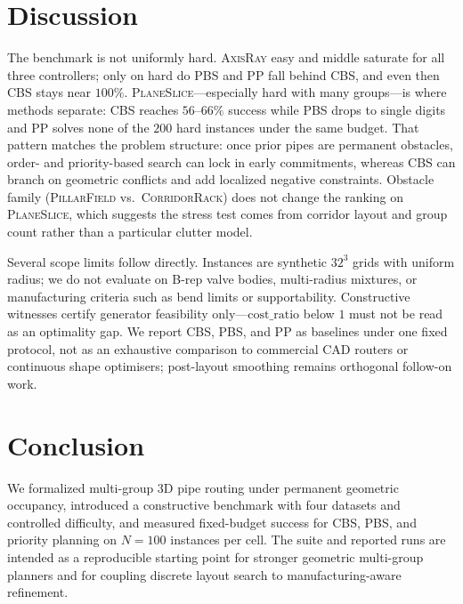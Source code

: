 
\section{Discussion}
\label{sec:discussion}

The benchmark is not uniformly hard.
\textsc{AxisRay} easy and middle saturate for all three controllers; only on
hard do PBS and PP fall behind CBS, and even then CBS stays near $100\%$.
\textsc{PlaneSlice}---especially hard with many groups---is where methods
separate: CBS reaches $56$--$66\%$ success while PBS drops to single digits
and PP solves none of the $200$ hard instances under the same budget.
That pattern matches the problem structure: once prior pipes are permanent
obstacles, order- and priority-based search can lock in early commitments,
whereas CBS can branch on geometric conflicts and add localized negative
constraints.
Obstacle family (\textsc{PillarField} vs.\ \textsc{CorridorRack}) does not
change the ranking on \textsc{PlaneSlice}, which suggests the stress test
comes from corridor layout and group count rather than a particular clutter
model.

Several scope limits follow directly.
Instances are synthetic $32^3$ grids with uniform radius; we do not evaluate on
B-rep valve bodies, multi-radius mixtures, or manufacturing criteria such as
bend limits or supportability.
Constructive witnesses certify generator feasibility only---$\mathrm{cost\_ratio}$
below $1$ must not be read as an optimality gap.
We report CBS, PBS, and PP as baselines under one fixed protocol, not as an
exhaustive comparison to commercial CAD routers or continuous shape
optimisers; post-layout smoothing remains orthogonal follow-on work.

\section{Conclusion}
\label{sec:conclusion}

We formalized multi-group 3D pipe routing under permanent geometric occupancy,
introduced a constructive benchmark with four datasets and controlled difficulty,
and measured fixed-budget success for CBS, PBS, and priority planning on
$N{=}100$ instances per cell.
The suite and reported runs are intended as a reproducible starting point for
stronger geometric multi-group planners and for coupling discrete layout search
to manufacturing-aware refinement.
